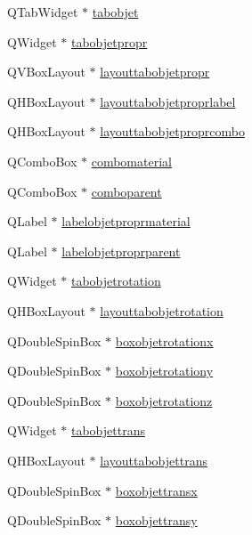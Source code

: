 \begin{DoxyCompactItemize}
\item 
Q\+Tab\+Widget $\ast$ \hyperlink{class_mondock_a3f12af44327a1739e8818ee91649ebbf}{tabobjet}
\item 
Q\+Widget $\ast$ \hyperlink{class_mondock_adc331c4d8373b45e636757e12a2bd5a0}{tabobjetpropr}
\item 
Q\+V\+Box\+Layout $\ast$ \hyperlink{class_mondock_ac56ddde4fb8bc59837027ed14f8b19d8}{layouttabobjetpropr}
\item 
Q\+H\+Box\+Layout $\ast$ \hyperlink{class_mondock_a933e33341a7ad640413b19c6d811559a}{layouttabobjetproprlabel}
\item 
Q\+H\+Box\+Layout $\ast$ \hyperlink{class_mondock_a666eed2f58369dbaea12c10c9c5f4888}{layouttabobjetproprcombo}
\item 
Q\+Combo\+Box $\ast$ \hyperlink{class_mondock_ab8773b4c45e6e0e13a9bb22793e3c870}{combomaterial}
\item 
Q\+Combo\+Box $\ast$ \hyperlink{class_mondock_a32ebd1f643a5f1b9749eb4f9d4940973}{comboparent}
\item 
Q\+Label $\ast$ \hyperlink{class_mondock_ac49c211334c5b4502c99dc47ff86fe1c}{labelobjetproprmaterial}
\item 
Q\+Label $\ast$ \hyperlink{class_mondock_a4d76ec3b85d44b07f7147f5b2a7c68a7}{labelobjetproprparent}
\item 
Q\+Widget $\ast$ \hyperlink{class_mondock_a917509c60bf1cd3eff74b0bd9c606dae}{tabobjetrotation}
\item 
Q\+H\+Box\+Layout $\ast$ \hyperlink{class_mondock_ab36da4ccb733ba45b30be8c325a593d9}{layouttabobjetrotation}
\item 
Q\+Double\+Spin\+Box $\ast$ \hyperlink{class_mondock_accc1854d02d6d2a0b61297b351bd196a}{boxobjetrotationx}
\item 
Q\+Double\+Spin\+Box $\ast$ \hyperlink{class_mondock_aeeea985e7f23ebf81696648d8e0dea40}{boxobjetrotationy}
\item 
Q\+Double\+Spin\+Box $\ast$ \hyperlink{class_mondock_af722379e41c8ebc43f6068754564aa4f}{boxobjetrotationz}
\item 
Q\+Widget $\ast$ \hyperlink{class_mondock_a8eee5e642f5cb6d30635c80417576622}{tabobjettrans}
\item 
Q\+H\+Box\+Layout $\ast$ \hyperlink{class_mondock_a1776a6148557d83c98a8a05368c08eef}{layouttabobjettrans}
\item 
Q\+Double\+Spin\+Box $\ast$ \hyperlink{class_mondock_a906d6de66e15f9b964d68947ac8ee94e}{boxobjettransx}
\item 
Q\+Double\+Spin\+Box $\ast$ \hyperlink{class_mondock_a15ed0b5c13500bfad6a2b5289c5a3ddf}{boxobjettransy}

\end{DoxyCompactItemize}
